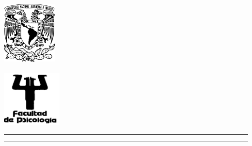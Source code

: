 \documentclass[
12pt, %
spanish, %
singlespacing, %
headsepline, %
]{MastersDoctoralThesis} %
\author{Adriana Felisa Chávez De la Peña}%
\begin{document}
\frontmatter %

\pagestyle{plain} %


\begin{titlepage}

\begin{minipage}[c][9in][s]{1in}
\centering
\hspace*{-0.2in} \includegraphics[width=1.1in]{Escudo-UNAM}\\[10pt]
\hskip 2pt\vrule width 2pt height 6.7in
\hskip 1mm\vrule width 1pt height 6.7in\\[10pt]
\hspace*{-0.2in} \includegraphics[width=1.2in]{PSI}
\end{minipage}\hskip 10pt
\begin{minipage}[c][\textheight][s]{5.125in}
\centering
{\Large\scshape\univname}
\vspace{3mm}\hrule height2pt
\vspace{1mm}\hrule height1pt
\vspace{3mm}
{\scshape\facname}\par
\vfill\vfill
{\def\baselinestretch{1}\LARGE\scshape\ttitle\par}
\vfill\vfill
\\[8pt]

\end{minipage}
\end{titlepage}
\end{document}
